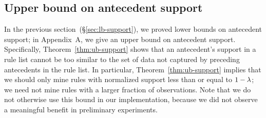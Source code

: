 \begin{arxiv}
\subsection{Upper bound on antecedent support}
\label{sec:ub-support}

In the previous section~(\S\ref{sec:lb-support}), we proved lower bounds on
antecedent support; in Appendix~A, we give an upper bound on antecedent support.
%
Specifically, Theorem~\ref{thm:ub-support} shows that an antecedent's
support in a rule list cannot be too similar to the set of data not
captured by preceding antecedents in the rule list.
%
In particular, Theorem~\ref{thm:ub-support} implies that we should
only mine rules with normalized support less than or equal to ${1 - {\lambda}}$;
we need not mine rules with a larger fraction of observations.
%
Note that we do not otherwise use this bound in our implementation,
because we did not observe a meaningful benefit in preliminary experiments.
\end{arxiv}

